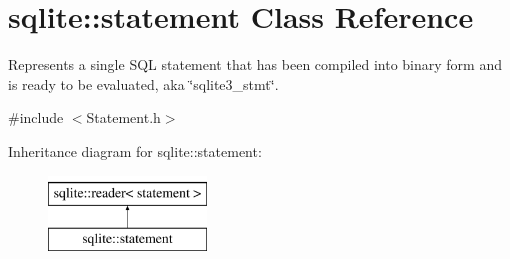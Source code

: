 \hypertarget{a00013}{\section{sqlite\-:\-:statement Class Reference}
\label{a00013}
}


Represents a single S\-Q\-L statement that has been compiled into binary form and is ready to be evaluated, aka \char`\"{}sqlite3\-\_\-stmt\char`\"{}.  




{\ttfamily \#include $<$Statement.\-h$>$}

Inheritance diagram for sqlite\-:\-:statement\-:\begin{figure}[H]
\begin{center}
\leavevmode
\includegraphics[height=2.000000cm]{a00013}
\end{center}
\end{figure}
